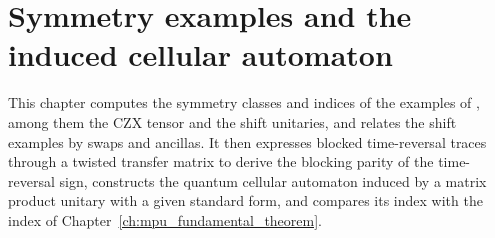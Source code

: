 \chapter{Symmetry examples and the induced cellular automaton}
\label{ch:mpu_symmetry_examples}

This chapter computes the symmetry classes and indices of the examples of
\cite{Cirac2017MPU}, among them the CZX tensor and the shift unitaries, and
relates the shift examples by swaps and ancillas. It then expresses blocked
time-reversal traces through a twisted transfer matrix to derive the blocking
parity of the time-reversal sign, constructs the quantum cellular automaton
induced by a matrix product unitary with a given standard form, and compares
its index with the index of Chapter~\ref{ch:mpu_fundamental_theorem}.


